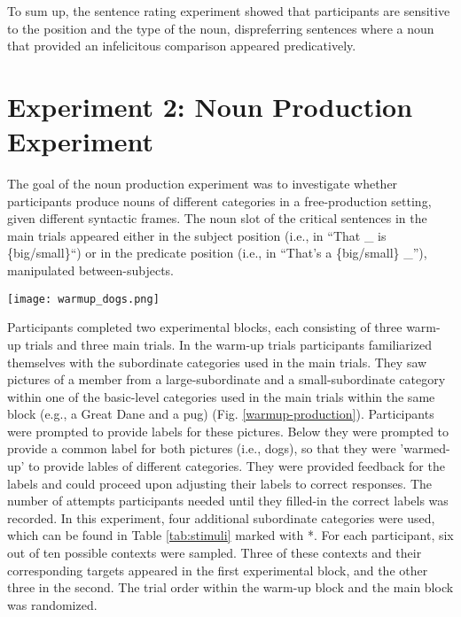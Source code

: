 To sum up, the sentence rating experiment showed that participants are sensitive to the position and the type of the noun, dispreferring sentences where a noun that provided an infelicitous comparison appeared predicatively.  

\section{Experiment 2: Noun Production Experiment}    


The goal of the noun production experiment was to investigate whether participants produce nouns of different categories in a free-production setting, given different syntactic frames.  The noun slot of the critical sentences in the main trials appeared either in the subject position (i.e., in “That \_ is \{big/small\}“) or in the predicate position (i.e., in “That’s a \{big/small\} \_”), manipulated between-subjects. 

\begin{figure*}[t]
	\begin{center}
		\texttt{[image: warmup\_dogs.png]}
	\end{center}
	\caption{Example view of the noun production warm-up trial: Participants have to label a large-subordinate (Great Dane, right) and a small-subordinate target (pug, left) for the dogs-category.}
	\label{warmup-production}
\end{figure*}
Participants completed two experimental blocks, each consisting of three warm-up trials and three main trials. In the warm-up trials participants familiarized themselves with the subordinate categories used in the main trials. They saw pictures of a member from a large-subordinate and a small-subordinate category within one of the basic-level categories used in the main trials within the same block (e.g., a Great Dane and a pug) (Fig. \ref{warmup-production}). Participants were prompted to provide labels for these pictures. Below they were prompted to provide a common label for both pictures (i.e., dogs), so that they were 'warmed-up' to provide lables of different categories. They were provided feedback for the labels and could proceed upon adjusting their labels to correct responses. The number of attempts participants needed until they filled-in the correct labels was recorded. In this experiment, four additional subordinate categories were used, which can be found in Table \ref{tab:stimuli} marked with *. For each participant, six out of ten possible contexts were sampled. Three of these contexts and their corresponding targets appeared in the first experimental block, and the other three in the second. The trial order within the warm-up block and the main block was randomized. 

